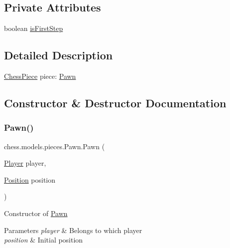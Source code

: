 \subsection*{Private Attributes}
\begin{DoxyCompactItemize}
\item 
boolean \mbox{\hyperlink{classchess_1_1models_1_1pieces_1_1_pawn_a450300d4ee1338fa478c717a345dd82c}{is\+First\+Step}}
\end{DoxyCompactItemize}


\subsection{Detailed Description}
\mbox{\hyperlink{classchess_1_1models_1_1_chess_piece}{Chess\+Piece}} piece\+: \mbox{\hyperlink{classchess_1_1models_1_1pieces_1_1_pawn}{Pawn}} 

\subsection{Constructor \& Destructor Documentation}
\mbox{\label{classchess_1_1models_1_1pieces_1_1_pawn_aa62632674360fd0518f583bf1477b8c1}} 
\subsubsection{\texorpdfstring{Pawn()}{Pawn()}}
{\footnotesize\ttfamily chess.\+models.\+pieces.\+Pawn.\+Pawn (\begin{DoxyParamCaption}\item[{\mbox{\hyperlink{enumchess_1_1models_1_1enums_1_1_player}{Player}}}]{player,  }\item[{\mbox{\hyperlink{classchess_1_1models_1_1_position}{Position}}}]{position }\end{DoxyParamCaption})}

Constructor of \mbox{\hyperlink{classchess_1_1models_1_1pieces_1_1_pawn}{Pawn}}


\begin{DoxyParams}{Parameters}
{\em player} & Belongs to which player \\
\hline
{\em position} & Initial position \\
\hline
\end{DoxyParams}


